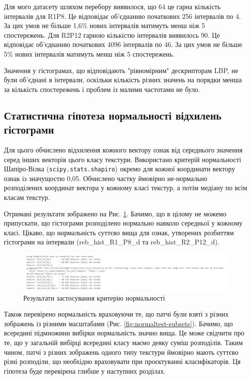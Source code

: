 Для мого датасету шляхом перебору виявилося, що 64 це гарна кількість інтервалів для R1P8. 
Це відповідає об'єднанню початкових 256 інтервалів по 4. 
За цих умов не більше 1,6\% нових інтервалів матимуть менш ніж 5 спостережень.
Для R2P12 гарною кількістю інтервалів виявилось 90. 
Це відповідає об'єднанню початкових 4096 інтервалів по 46. 
За цих умов не більше 5\% нових інтервалів матимуть менш ніж 5 спостережень.

Значення у гістограмах, що відповідають "рівномірним" дескрипторам LBP, не були об'єднані в інтервали, 
оскільки кількість різних значень на порядки менша за кількість спостережень і проблем із малими частотами не було.

\subsection{Статистична гіпотеза нормальності відхилень гістограми}\label{section2.1c1}

Для цього обчислено відхилення кожного вектору ознак від середнього значення серед інших векторів цього класу текстури.
Використано критерій нормальності Шапіро-Вілка (\verb|scipy.stats.shapiro|) окремо для кожної координати вектору ознак із значущостю 0,05.
Обчислено частку ймовірно не-нормально розподілених координат вектора у кожному класі текстур, а потім медіану по всім класам текстур.

Отримані результати зображено на Рис. \ref{fig:normaltest}. 
Бачимо, що в цілому не можемо припускати, що гістограми розподілено нормально навколо середньої у кожному класі.
Цікаво, що нормальність суттєво вища для ознак, утворених розбиттям гістограми на інтервали (reb\_hist\_R1\_P8\_d та reb\_hist\_R2\_P12\_d).

\begin{figure}[h]
    \centering
    \includegraphics[width=0.99\textwidth]{img/normality-test.png}
    \caption{
        Результати застосування критерію нормальності 
    }
    \label{fig:normaltest}
\end{figure}

Також перевірено нормальність враховуючи те, що патчі були взяті з різних зображень із різними масштабами (Рис. \ref{fig:normaltest-subsets}).
Бачимо, що всередині підмножини вибірки нормальність значно вища.
Це може свідчити про те, що у загальній вибірці всередині класу маємо деяку суміш розподілів.
Таким чином, патчі з різних зображень одного типу текстури ймовірно мають суттєво різні розподіли, що необхідно враховувати при проєктуванні класифікаторів.
Ця гіпотеза буде перевірена глибше у наступних розділах.

